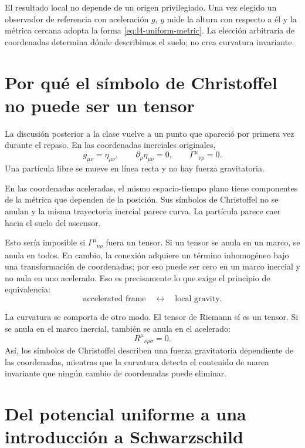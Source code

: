El resultado local no depende de un origen privilegiado. Una vez elegido un observador de referencia con aceleración \(g\), \(y\) mide la altura con respecto a él y la métrica cercana adopta la forma \eqref{eq:l4-uniform-metric}. La elección arbitraria de coordenadas determina dónde describimos el suelo; no crea curvatura invariante.

\section{Por qué el símbolo de Christoffel no puede ser un tensor}

La discusión posterior a la clase vuelve a un punto que apareció por primera vez durante el repaso. En las coordenadas inerciales originales,
\begin{equation}
g_{\mu\nu}=\eta_{\mu\nu},
\qquad
\partial_\rho\eta_{\mu\nu}=0,
\qquad
\Gamma^\mu{}_{\nu\rho}=0.
\end{equation}
Una partícula libre se mueve en línea recta y no hay fuerza gravitatoria.

En las coordenadas aceleradas, el mismo espacio-tiempo plano tiene componentes de la métrica que dependen de la posición. Sus símbolos de Christoffel no se anulan y la misma trayectoria inercial parece curva. La partícula parece caer hacia el suelo del ascensor.

Esto sería imposible si \(\Gamma^\mu{}_{\nu\rho}\) fuera un tensor. Si un tensor se anula en un marco, se anula en todos. En cambio, la conexión adquiere un término inhomogéneo bajo una transformación de coordenadas; por eso puede ser cero en un marco inercial y no nula en uno acelerado. Eso es precisamente lo que exige el principio de equivalencia:
\begin{equation}
\text{accelerated frame}
\quad\longleftrightarrow\quad
\text{local gravity}.
\end{equation}

La curvatura se comporta de otro modo. El tensor de Riemann sí es un tensor. Si se anula en el marco inercial, también se anula en el acelerado:
\begin{equation}
R^\mu{}_{\nu\rho\sigma}=0.
\end{equation}
Así, los símbolos de Christoffel describen una fuerza gravitatoria dependiente de las coordenadas, mientras que la curvatura detecta el contenido de marea invariante que ningún cambio de coordenadas puede eliminar.

\section{Del potencial uniforme a una introducción a Schwarzschild}

